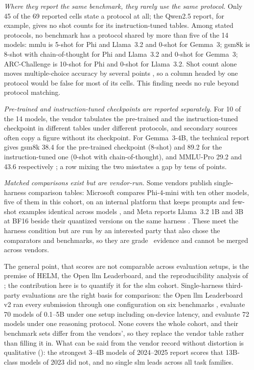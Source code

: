 \emph{Where they report the same benchmark, they rarely use the same protocol.} Only 45 of the 69 reported cells state a protocol at all; the Qwen2.5 report, for example, gives no shot counts for its instruction-tuned tables. Among stated protocols, no benchmark has a protocol shared by more than five of the 14 models: \gls{mmlu} is 5-shot for Phi and Llama~3.2 and 0-shot for Gemma~3; \gls{gsm8k} is 8-shot with chain-of-thought for Phi and Llama~3.2 and 0-shot for Gemma~3; ARC-Challenge is 10-shot for Phi and 0-shot for Llama~3.2. Shot count alone moves multiple-choice accuracy by several points \citep{biderman2024lessons}, so a column headed by one protocol would be false for most of its cells. This finding needs no rule beyond protocol matching.

\emph{Pre-trained and instruction-tuned checkpoints are reported separately.} For 10 of the 14 models, the vendor tabulates the pre-trained and the instruction-tuned checkpoint in different tables under different protocols, and secondary sources often copy a figure without its checkpoint. For Gemma~3-4B, the technical report gives \gls{gsm8k} 38.4 for the pre-trained checkpoint (8-shot) and 89.2 for the instruction-tuned one (0-shot with chain-of-thought), and MMLU-Pro 29.2 and 43.6 respectively \citep{team2025gemma3}; a row mixing the two misstates a gap by tens of points.

\emph{Matched comparisons exist but are vendor-run.} Some vendors publish single-harness comparison tables: Microsoft compares Phi-4-mini with ten other models, five of them in this cohort, on an internal platform that keeps prompts and few-shot examples identical across models \citep{microsoft2025phi4minicard}, and Meta reports Llama~3.2 1B and 3B at BF16 beside their quantized versions on the same harness \citep{meta2024llama32card}. These meet the harness condition but are run by an interested party that also chose the comparators and benchmarks, so they are grade~\evC{} evidence and cannot be merged across vendors.

The general point, that scores are not comparable across evaluation setups, is the premise of HELM, the Open \gls{llm} Leaderboard, and the reproducibility analysis of \citet{biderman2024lessons}; the contribution here is to quantify it for the \gls{slm} cohort. Single-harness third-party evaluations are the right basis for comparison: the Open \gls{llm} Leaderboard v2 ran every submission through one configuration on six benchmarks \citep{hf2024openllmlb}, \citet{lu2024slmsurvey} evaluate 70 models of 0.1--5B under one setup including on-device latency, and \citet{srivastava2025thinkslm} evaluate 72 models under one reasoning protocol. None covers the whole cohort, and their benchmark sets differ from the vendors', so they replace the vendor table rather than filling it in. What can be said from the vendor record without distortion is qualitative (\evD): the strongest 3--4B models of 2024--2025 report scores that 13B-class models of 2023 did not, and no single \gls{slm} leads across all task families.

